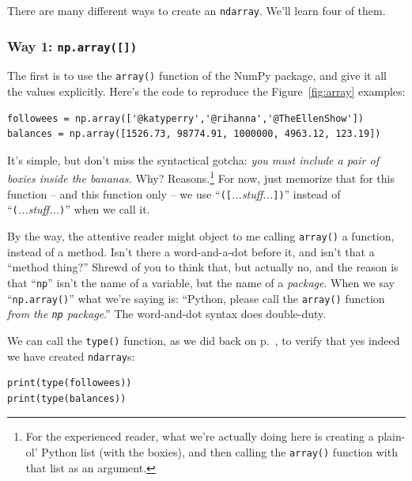 There are many different ways to create an \texttt{ndarray}. We'll learn four
of them.

\subsubsection{Way 1: \texttt{np.array([])}}

\label{arrayFunction}

The first is to use the \texttt{array()} function of the NumPy package, and
give it all the values explicitly. Here's the code to reproduce the
Figure~\ref{fig:array} examples:

\begin{Verbatim}[fontsize=\CBCodeSmall,samepage=true,frame=single,framesep=3mm]
followees = np.array(['@katyperry','@rihanna','@TheEllenShow'])
balances = np.array([1526.73, 98774.91, 1000000, 4963.12, 123.19])
\end{Verbatim}

It's simple, but don't miss the syntactical gotcha: \textit{you must include a
pair of boxies inside the bananas.} Why? Reasons.\footnote{For the experienced
reader, what we're actually doing here is creating a plain-ol' Python list
(with the boxies), and then calling the \texttt{array()} function with that
list as an argument.} For now, just memorize that for this function -- and this
function only -- we use ``\texttt{([}\textsl{...stuff...}\texttt{])}'' instead
of ``\texttt{(}\textsl{...stuff...}\texttt{)}'' when we call it.

By the way, the attentive reader might object to me calling \texttt{array()} a
function, instead of a method. Isn't there a word-and-a-dot before it, and
isn't that a ``method thing?'' Shrewd of you to think that, but actually no,
and the reason is that ``\texttt{np}'' isn't the name of a variable, but the
name of a \textit{package}. When we say ``\texttt{np.array()}'' what we're
saying is: ``Python, please call the \texttt{array()} function \textit{from the
\texttt{np} package}.'' The word-and-dot syntax does double-duty.

\label{arrayType}
We can call the \texttt{type()} function, as we did back on
p.~\pageref{typeFunction}, to verify that yes indeed we have created
\texttt{ndarray}s:

\begin{Verbatim}[fontsize=\small,samepage=true,frame=single,framesep=3mm]
print(type(followees))
print(type(balances))
\end{Verbatim}

